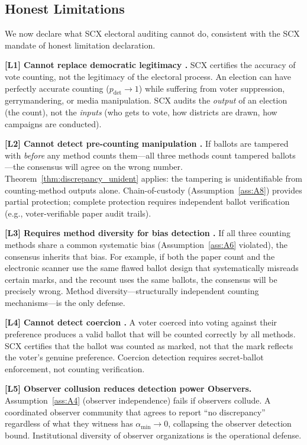 \documentclass[11pt,a4paper]{article}
\theoremstyle{definition}
\newcommand{\SCX}{\textsc{SCX}}
\newcommand{\limitationTag}[1]{\textsf{\textbf{[L#1]}}}
\begin{document}
\subsection{Honest Limitations}
We now declare what \SCX{} electoral auditing cannot do, consistent with the \SCX{} mandate of honest limitation declaration.
\begin{enumerate}[label=\limitationTag{\arabic*},leftmargin=*]
    \item \textbf{\limitationTag{1} Cannot replace democratic legitimacy .} \SCX{} certifies the accuracy of vote counting, not the legitimacy of the electoral process. An election can have perfectly accurate counting ($p_{\text{det}} \to 1$) while suffering from voter suppression, gerrymandering, or media manipulation. \SCX{} audits the \textit{output} of an election (the count), not the \textit{inputs} (who gets to vote, how districts are drawn, how campaigns are conducted).
    \item \textbf{\limitationTag{2} Cannot detect pre-counting manipulation .} If ballots are tampered with \textit{before} any method counts them---all three methods count tampered ballots---the consensus will agree on the wrong number. Theorem~\ref{thm:discrepancy_unident} applies: the tampering is unidentifiable from counting-method outputs alone. Chain-of-custody (Assumption~\ref{ass:A8}) provides partial protection; complete protection requires independent ballot verification (e.g., voter-verifiable paper audit trails).
    \item \textbf{\limitationTag{3} Requires method diversity for bias detection .} If all three counting methods share a common systematic bias (Assumption~\ref{ass:A6} violated), the consensus inherits that bias. For example, if both the paper count and the electronic scanner use the same flawed ballot design that systematically misreads certain marks, and the recount uses the same ballots, the consensus will be precisely wrong. Method diversity---structurally independent counting mechanisms---is the only defense.
    \item \textbf{\limitationTag{4} Cannot detect coercion .} A voter coerced into voting against their preference produces a valid ballot that will be counted correctly by all methods. \SCX{} certifies that the ballot was counted as marked, not that the mark reflects the voter's genuine preference. Coercion detection requires secret-ballot enforcement, not counting verification.
    \item \textbf{\limitationTag{5} Observer collusion reduces detection power Observers.} Assumption~\ref{ass:A4} (observer independence) fails if observers collude. A coordinated observer community that agrees to report ``no discrepancy'' regardless of what they witness has $\alpha_{\min} \to 0$, collapsing the observer detection bound. Institutional diversity of observer organizations is the operational defense.

\end{enumerate}
\end{document}
